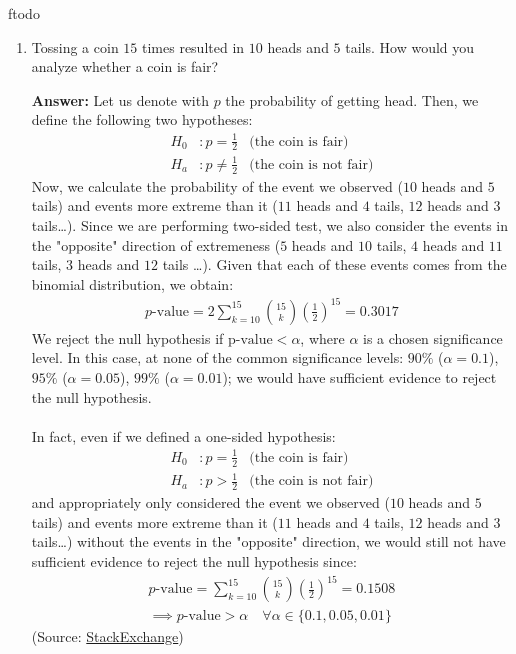 ƒtodo\documentclass{article}
\newenvironment{QandA}{\begin{enumerate}[label=\arabic*.]}{\end{enumerate}}
\newenvironment{answer}{\par\normalfont \textbf{Answer:}}{}
\begin{document}
\begin{QandA}
    \item Tossing a coin $15$ times resulted in $10$ heads and $5$ tails. How would you analyze whether a coin is fair?
    \begin{answer}
        Let us denote with $p$ the probability of getting head. Then, we define the following two hypotheses:
        \begin{align*}
            H_0&: p = \frac{1}{2} &\text{(the coin is fair)} \\
            H_a&: p \neq \frac{1}{2} &\text{(the coin is not fair)}
        \end{align*}
        Now, we calculate the probability of the event we observed ($10$ heads and $5$ tails) and events more extreme than it ($11$ heads and $4$ tails, $12$ heads and $3$ tails\ldots). Since we are performing two-sided test, we also consider the events in the "opposite" direction of extremeness ($5$ heads and $10$ tails, $4$ heads and $11$ tails, $3$ heads and $12$ tails \ldots). Given that each of these events comes from the binomial distribution, we obtain:
        \begin{align*}
            p\text{-value} = 2 \sum_{k=10}^{15} {15 \choose k} \left(\frac{1}{2}\right)^{15} = 0.3017
        \end{align*}
        We reject the null hypothesis if p$\text{-value} < \alpha$, where $\alpha$ is a chosen significance level. In this case, at none of the common significance levels: $90\%$ ($\alpha=0.1$), $95\%$ ($\alpha=0.05$), $99\%$ ($\alpha = 0.01$); we would have sufficient evidence to reject the null hypothesis.\\\\
        In fact, even if we defined a one-sided hypothesis:
        \begin{align*}
            H_0&: p = \frac{1}{2} &\text{(the coin is fair)} \\
            H_a&: p > \frac{1}{2} &\text{(the coin is not fair)}
        \end{align*}
        and appropriately only considered the event we observed ($10$ heads and $5$ tails) and events more extreme than it ($11$ heads and $4$ tails, $12$ heads and $3$ tails\ldots) without the events in the "opposite" direction, we would still not have sufficient evidence to reject the null hypothesis since:
        \begin{align*}
            p\text{-value} = \sum_{k=10}^{15} {15 \choose k} \left(\frac{1}{2}\right)^{15} = 0.1508 \\
            \implies p\text{-value} > \alpha \quad \forall \alpha \in \{0.1, 0.05, 0.01\}
        \end{align*}
        (Source: \href{https://stats.stackexchange.com/questions/21581/how-to-assess-whether-a-coin-tossed-900-times-and-comes-up-heads-490-times-is-bi}{StackExchange})
    \end{answer}


\end{QandA}
\end{document}
